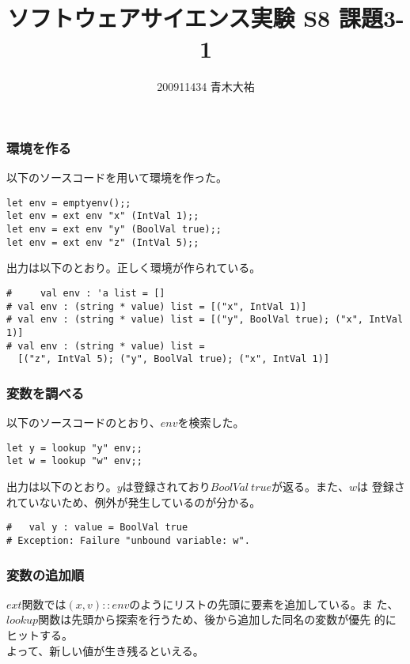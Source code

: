 \documentclass[a4paper,9pt]{jarticle}
\title{ソフトウェアサイエンス実験 S8 課題3-1}
\author{200911434 青木大祐}
\begin{document}
\maketitle
\setcounter{section}{3}
\setcounter{subsection}{1}

\newpage
\subsubsection{環境を作る}
以下のソースコードを用いて環境を作った。
\begin{lstlisting}
let env = emptyenv();;
let env = ext env "x" (IntVal 1);;
let env = ext env "y" (BoolVal true);;
let env = ext env "z" (IntVal 5);;
\end{lstlisting}

出力は以下のとおり。正しく環境が作られている。
\begin{lstlisting}
#     val env : 'a list = []
# val env : (string * value) list = [("x", IntVal 1)]
# val env : (string * value) list = [("y", BoolVal true); ("x", IntVal 1)]
# val env : (string * value) list =
  [("z", IntVal 5); ("y", BoolVal true); ("x", IntVal 1)]
\end{lstlisting}


\subsubsection{変数を調べる}
以下のソースコードのとおり、$env$を検索した。
\begin{lstlisting}
let y = lookup "y" env;;
let w = lookup "w" env;;
\end{lstlisting}

出力は以下のとおり。$y$は登録されており$BoolVal\:true$が返る。また、$w$は
登録されていないため、例外が発生しているのが分かる。
\begin{lstlisting}
#   val y : value = BoolVal true
# Exception: Failure "unbound variable: w".
\end{lstlisting}

\subsubsection{変数の追加順}
$ext$関数では$(x,v) :: env$のようにリストの先頭に要素を追加している。ま
た、$lookup$関数は先頭から探索を行うため、後から追加した同名の変数が優先
的にヒットする。\\
よって、新しい値が生き残るといえる。
\end{document}

